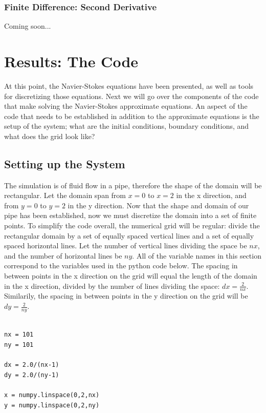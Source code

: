 \documentclass[twocolumn,12pth]{article}
\begin{document}
\subsubsection{Finite Difference: Second Derivative}

Coming soon...

\section{Results: The Code}

At this point, the Navier-Stokes equations have been presented, as well as tools for discretizing those equations.
Next we will go over the components of the code that make solving the Navier-Stokes approximate equations.
An aspect of the code that needs to be established in addition to the approximate equations is the setup of the system; what are the initial conditions, boundary conditions, and what does the grid look like?

\subsection{Setting up the System}

The simulation is of fluid flow in a pipe, therefore the shape of the domain will be rectangular.
Let the domain span from $x = 0$ to $x = 2$ in the x direction, and from $y = 0$ to $y = 2$ in the y direction.
Now that the shape and domain of our pipe has been established, now we must discretize the domain into a set of finite points.
To simplify the code overall, the numerical grid will be regular: divide the rectangular domain by a set of equally spaced vertical lines and a set of equally spaced horizontal lines.
Let the number of vertical lines dividing the space be $nx$, and the number of horizontal lines be $ny$.
All of the variable names in this section correspond to the variables used in the python code below.
The spacing in between points in the x direction on the grid will equal the length of the domain in the x direction, divided by the number of lines dividing the space: $dx = \frac{2}{nx}$.
Similarily, the spacing in between points in the y direction on the grid will be $dy = \frac{2}{ny}$. 

\begin{lstlisting}

nx = 101
ny = 101

dx = 2.0/(nx-1)
dy = 2.0/(ny-1)

x = numpy.linspace(0,2,nx)
y = numpy.linspace(0,2,ny)

\end{lstlisting}
\end{document}
